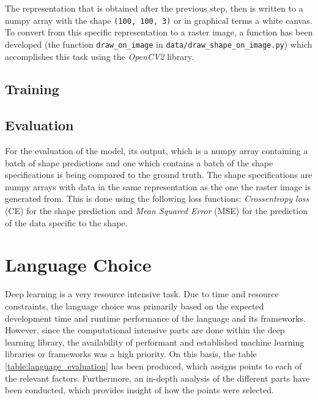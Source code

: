 \documentclass[12pt, a4paper, titlepage]{report}
\begin{document}
The representation that is obtained after the previous step, then is written to a numpy array with the shape \lstinline{(100, 100, 3)} or in graphical terms a white canvas. To convert from this specific representation to a raster image, a function has been developed (the function \lstinline{draw_on_image} in \lstinline{data/draw_shape_on_image.py}) which accomplishes this task using the \emph{OpenCV2} library.

\subsection{Training}
\subsection{Evaluation}

For the evaluation of the model, its output, which is a numpy array containing a batch of shape predictions and one which contains a batch of the shape specifications is being compared to the ground truth. The shape specifications are numpy arrays with data in the same representation as the one the raster image is generated from.
This is done using the following loss functions: \emph{Crossentropy loss} (CE) for the shape prediction and \emph{Mean Squared Error} (MSE) for the prediction of the data specific to the shape.


\section{Language Choice}  %

Deep learning is a very resource intensive task. Due to time and resource constraints, the language choice was primarily based on the expected development time and runtime performance of the language and its frameworks. However, since the computational intensive parts are done within the deep learning library, the availability of performant and established machine learning libraries or frameworks was a high priority. On this basis, the table \ref{table:language_evaluation} has been produced, which assigns points to each of the relevant factors. Furthermore, an in-depth analysis of the different parts have been conducted, which provides insight of how the points were selected.
\end{document}
